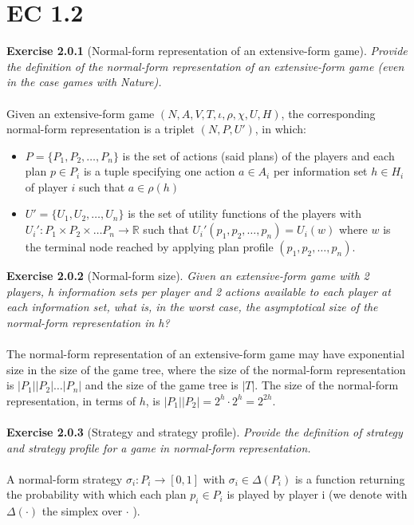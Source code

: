 \section{EC 1.2}
\textbf{Exercise 2.0.1} (Normal-form representation of an extensive-form game). \textit{Provide the definition of the normal-form
representation of an extensive-form game (even in the case games with Nature).}\\\\
Given an extensive-form game $(N, A, V, T, \iota, \rho, \chi,U,H)$, the corresponding normal-form representation is a triplet $(N, P,U')$, in which:
\begin{itemize}
\item $P = \{P_1, P_2, \ldots , P_n\}$ is the set of actions (said plans) of the players and each plan $p \in P_i$ is a tuple specifying one action $a \in A_i$ per information set $h \in H_i$ of player $i$ such that $a \in \rho(h)$
\item $U' = \{U_1,U_2, \ldots ,U_n\}$ is the set of utility functions of the players with $U_i' : P_1 \times  P_2 \times \ldots  P_n \rightarrow \mathbb{R}$ such that $U_i'(p_1, p_2, \ldots, p_n) = U_i(w)$ where $w$ is the terminal node reached by applying plan profile $(p_1, p_2, \ldots, p_n)$.
\end{itemize}
\textbf{Exercise 2.0.2} (Normal-form size). \textit{Given an extensive-form game with 2 players, h information sets per player and 2 actions available to each player at each information set, what is, in the worst case, the asymptotical size of the normal-form representation in h?}\\\\
The normal-form representation of an extensive-form game may have exponential size in the size of the game tree, where the size of the normal-form representation is $|P_1| |P_2| \ldots |P_n|$ and the size of the game tree is $|T|$. The size of the normal-form representation, in terms of $h$, is $|P_1||P_2| = 2^h \cdot 2^h = 2^{2h}$.\\\\
\textbf{Exercise 2.0.3} (Strategy and strategy profile). \textit{Provide the definition of strategy and strategy profile for a game in normal-form representation.}\\\\
A normal-form strategy $ \sigma_{i}: P_{i} \rightarrow [0,1] $ with $ \sigma_{i} \in \Delta (P_{i}) $ is a function returning the probability with which each plan $ p_{i} \in P_{i} $ is played by player i (we denote with $ \Delta(\cdot) $ the simplex over $ \cdot $ ).\\
